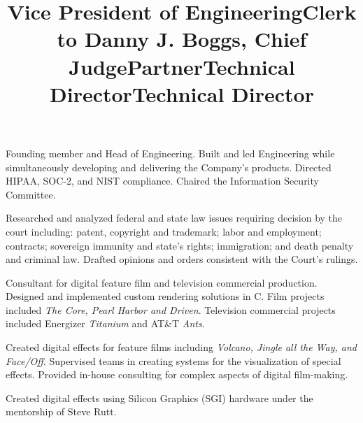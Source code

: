 \documentclass[margin]{res}
\begin{document}
\begin{resume}
\title{\textbf{Vice President of Engineering}}
\begin{position}
\hspace*{.5cm}Founding member and Head of Engineering. Built and led Engineering while simultaneously developing and delivering the Company's products. Directed HIPAA, SOC-2, and NIST compliance. Chaired the Information Security Committee.
\end{position}


\title{\textbf{Clerk to Danny J. Boggs, Chief Judge}}
\begin{position}
\hspace*{.5cm}Researched and analyzed federal and state law issues requiring decision by the court including: patent, copyright and trademark; labor and employment; contracts; sovereign immunity and state’s rights; immigration; and death penalty and criminal law. Drafted opinions and orders consistent with the Court’s rulings.
\end{position}

\title{\textbf{Partner}}
\begin{position}
\hspace*{.5cm}Consultant for digital feature film and television commercial production. Designed and implemented custom rendering solutions in C. Film projects included \textit{The Core, Pearl Harbor and Driven}. Television commercial projects included Energizer \textit{Titanium} and AT\&T \textit{Ants}.
\end{position}

\title{\textbf{Technical Director}}
\begin{position}
\hspace*{.5cm}Created digital effects for feature films including \textit{Volcano, Jingle all the Way, and Face/Off}. Supervised teams in creating systems for the visualization of special effects. Provided in-house consulting for complex aspects of digital film-making.
\end{position}

\title{\textbf{Technical Director}}
\begin{position}
\hspace*{.5cm}Created digital effects using Silicon Graphics (SGI) hardware under the mentorship of Steve Rutt.
\end{position}


\end{resume}
\end{document}

